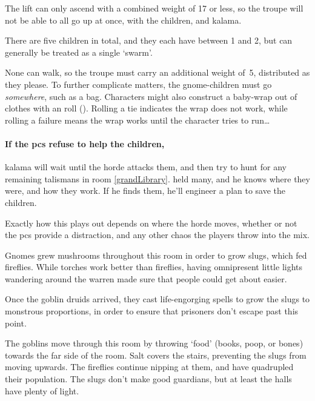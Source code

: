 The lift can only ascend with a combined \gls{weight} of 17 or less, so the troupe will not be able to all go up at once, with the children, and \gls{kalama}.


There are five children in total, and they each have  between 1 and 2, but can generally be treated as a single `\gls{swarm}'.

None can walk, so the troupe must carry an additional \gls{weight} of~5, distributed as they please.
To further complicate matters, the gnome-children must go \emph{somewhere}, such as a bag.
Characters might also construct a baby-wrap out of clothes with an  roll (\tn[10]).
Rolling a tie indicates the wrap does not work, while rolling a failure means the wrap works until the character tries to run\ldots

\paragraph{If the \glspl{pc} refuse to help the children,}
\gls{kalama} will wait until the horde attacks them, and then try to hunt for any remaining \glspl{talisman} in room \vref{grandLibrary}.
 held many, and he knows where they were, and how they work.
If he finds them, he'll engineer a plan to save the children.

Exactly how this plays out depends on where the horde moves, whether or not the \glspl{pc} provide a distraction, and any other chaos the players throw into the mix.


\begin{exampletext}
  Gnomes grew mushrooms throughout this room in order to grow slugs, which fed fireflies.
  While torches work better than fireflies, having omnipresent little lights wandering around the \gls{warren} made sure that people could get about easier.

  Once the goblin druids arrived, they cast life-engorging spells to grow the slugs to monstrous proportions, in order to ensure that prisoners don't escape past this point.

  The goblins move through this room by throwing `food' (books, poop, or bones) towards the far side of the room.
  Salt covers the stairs, preventing the slugs from moving upwards.
  The fireflies continue nipping at them, and have quadrupled their population.
  The slugs don't make good guardians, but at least the halls have plenty of light.
\end{exampletext}

